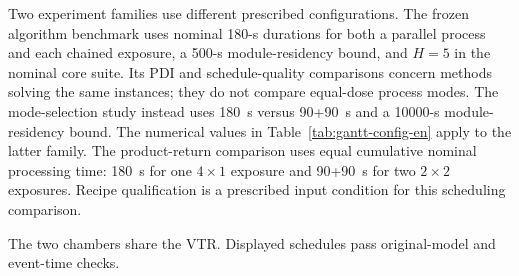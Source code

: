 \documentclass[journal]{IEEEtran}
\newcounter{algorithm}
\begin{document}
Two experiment families use different prescribed configurations. The frozen algorithm benchmark uses nominal 180-s durations for both a parallel process and each chained exposure, a 500-s module-residency bound, and $H=5$ in the nominal core suite. Its PDI and schedule-quality comparisons concern methods solving the same instances; they do not compare equal-dose process modes. The mode-selection study instead uses 180~s versus 90+90~s and a 10000-s module-residency bound. The numerical values in Table~\ref{tab:gantt-config-en} apply to the latter family. The product-return comparison uses equal cumulative nominal processing time: 180~s for one $4\times1$ exposure and 90+90~s for two $2\times2$ exposures. Recipe qualification is a prescribed input condition for this scheduling comparison.

The two chambers share the VTR. Displayed schedules pass original-model and event-time checks.
\end{document}
